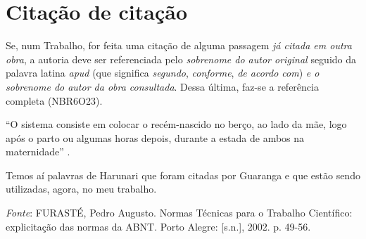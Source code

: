 \section{Citação de citação}

Se, num Trabalho, for feita uma citação de alguma passagem \emph{já citada em outra obra}, a autoria deve ser referenciada pelo \emph{sobrenome do autor original} seguido da palavra latina \emph{apud} (que significa \emph{segundo}, \emph{conforme}, \emph{de acordo com}) \emph{e o sobrenome do autor da obra consultada}. Dessa última, faz-se a referência completa (NBR6O23).

``O sistema consiste em colocar o recém-nascido no berço, ao lado da mãe, logo após o parto ou algumas horas depois, durante a estada de ambos na maternidade'' .

Temos aí palavras de Harunari que foram citadas por Guaranga e que estão sendo utilizadas, agora, no meu trabalho.

\emph{Fonte}: FURASTÉ, Pedro Augusto. Normas Técnicas para o Trabalho Científico: explicitação das normas da ABNT. Porto Alegre: [s.n.], 2002. p. 49-56.
